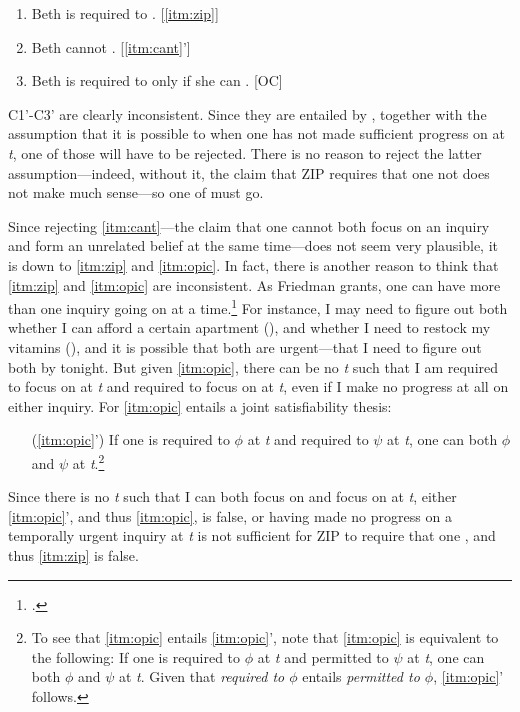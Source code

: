 \documentclass[12pt]{article}
\begin{document}
\begin{enumerate}[label=(C\arabic*'),ref=C\arabic*]
    \item Beth is required to \foc{}. [\ref*{itm:zip}]
    \item Beth cannot \foc{}. [\ref*{itm:cant}']
    \item Beth is required to \foc{} only if she can \foc{}. [OC]
\end{enumerate}
%
C1'-C3' are clearly inconsistent. Since they are entailed by \psub{}, together with the assumption that it is possible to \jud{} when one has not made sufficient progress on  at \textit{t}, one of those will have to be rejected. There is no reason to reject the latter assumption---indeed, without it, the claim that ZIP requires that one not \jud{} does not make much sense---so one of \psub{} must go.

Since rejecting \ref*{itm:cant}---the claim that one cannot both focus on an inquiry and form an unrelated belief at the same time---does not seem very plausible, it is down to \ref*{itm:zip} and \ref*{itm:opic}. In fact, there is another reason to think that \ref*{itm:zip} and \ref*{itm:opic} are inconsistent. As Friedman grants, one can have more than one inquiry going on at a time.\footnote{\textcite[10]{friedman_epistemic_nodate}.} For instance, I may need to figure out both whether I can afford a certain apartment (), and whether I need to restock my vitamins (), and it is possible that both are urgent---that I need to figure out both by tonight. But given \ref*{itm:opic}, there can be no \textit{t} such that I am required to focus on  at \textit{t} and required to focus on  at \textit{t}, even if I make no progress at all on either inquiry. For \ref*{itm:opic} entails a joint satisfiability thesis:

\begin{enumerate}
    \item[(\ref*{itm:opic}')] If one is required to $\phi$ at \textit{t} and required to $\psi$ at \textit{t}, one can both $\phi$ and $\psi$ at \textit{t}.\footnote{To see that \ref*{itm:opic} entails \ref*{itm:opic}', note that \ref*{itm:opic} is equivalent to the following: If one is required to $\phi$ at \textit{t} and permitted to $\psi$ at \textit{t}, one can both $\phi$ and $\psi$ at \textit{t}. Given that \textit{required to $\phi$} entails \textit{permitted to $\phi$}, \ref*{itm:opic}' follows.}
\end{enumerate}
%
Since there is no \textit{t} such that I can both focus on  and focus on  at \textit{t}, either \ref*{itm:opic}', and thus \ref*{itm:opic}, is false, or having made no progress on a temporally urgent inquiry  at \textit{t} is not sufficient for ZIP to require that one \foc{}, and thus \ref*{itm:zip} is false.
\end{document}
